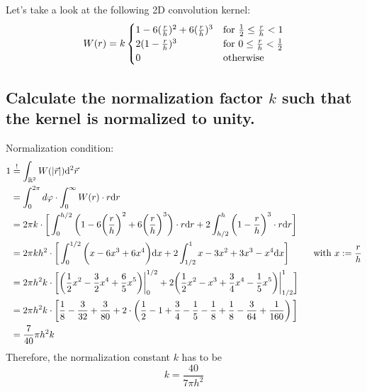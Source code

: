 Let's take a look at the following 2D convolution kernel:
\begin{equation}
    W(r)=k\begin{cases}
        1-6(\frac{r}{h})^2+6(\frac{r}{h})^3 
        & \textnormal{for }\frac{1}{2}\leq\frac{r}{h}<1 \\
        2(1-\frac{r}{h})^3
        & \textnormal{for }0\leq\frac{r}{h}<\frac{1}{2} \\
        0 
        & \textnormal{otherwise} \\
    \end{cases}
\end{equation}

\subsection{Calculate the normalization factor $k$ such that the 
kernel is normalized to unity.}
    Normalization condition:
    \begin{align}
        1
        &\overset{!}{=}\int_{\mathbb{R}^2}W(|\vec r|) \mathrm{d}^2\vec r \\
        &=\int_0^{2\pi}d\varphi\cdot\int_0^\infty W(r)\cdot r \mathrm{d} r \\
        &=2\pi k\cdot\bigg[
            \int_0^{h/2}\bigg(
                1-6\bigg(\frac{r}{h}\bigg)^2+
                6\bigg(\frac{r}{h}\bigg)^3
            \bigg)\cdot r \mathrm{d} r+2\int_{h/2}^h\bigg(1-\frac{r}{h}\bigg)^3\cdot r \mathrm{d} r
        \bigg] \\
        &=2\pi kh^2\cdot\bigg[
            \int_0^{1/2}\bigg(
                x-6x^3+
                6x^4
            \bigg) \mathrm{d} x+2\int_{1/2}^1 x - 3x^2 + 3x^3 - x^4 \mathrm{d} x
        \bigg] \ \ \ \ \ \ \ \ \textnormal{with $x:=\frac{r}{h}$} \\
        &=2\pi h^2k\cdot\bigg[
            \bigg(
                \frac{1}{2}x^2-\frac{3}{2}x^4 + \frac{6}{5}x^5 
            \bigg)\bigg|_0^{1/2}+2\bigg(
                \frac{1}{2}x^2 - x^3 + \frac{3}{4}x^4 - \frac{1}{5}x^5
            \bigg)\bigg|_{1/2}^{1}
        \bigg] \\
        &=2\pi h^2k\cdot\bigg[
            \frac{1}{8} - \frac{3}{32} + \frac{3}{80} + 2 \cdot \left(\frac{1}{2}- 1 + \frac{3}{4} -\frac{1}{5} - \frac{1}{8} + \frac{1}{8} -\frac{3}{64} + \frac{1}{160}\right)  
        \bigg] \\
        &=\frac{7}{40}\pi h^2k
    \end{align}
    Therefore, the normalization constant $k$ has to be
    \begin{equation}
        k=\frac{40}{7\pi h^2}
    \end{equation}

